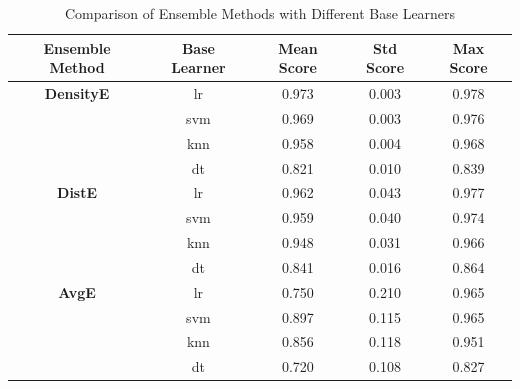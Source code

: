 \documentclass[lettersize,journal]{IEEEtran}
\begin{document}
	\setlength{\tabcolsep}{2pt} %
	
	\begin{table}[htbp]
		
	    \begin{center}
			
			\caption{Comparison of Ensemble Methods with Different Base Learners}
			
			\label{tab:ensemble_comparison}
			
			\begin{tabular}{|c|c|c|c|c|}
				
				\hline 
				
				\textbf{Ensemble Method} & \textbf{Base Learner} & \textbf{Mean Score} & \textbf{Std Score} & \textbf{Max Score} \\
				
				\hline
				
				\textbf{DensityE} & lr & 0.973 & 0.003 & 0.978 \\
				
				& svm & 0.969 & 0.003 & 0.976 \\
				
				& knn & 0.958 & 0.004 & 0.968 \\
				
				& dt & 0.821 & 0.010 & 0.839 \\
				
				\hline 
				
				\textbf{DistE} & lr & 0.962 & 0.043 & 0.977 \\
				
				& svm & 0.959 & 0.040 & 0.974 \\
				
				& knn & 0.948 & 0.031 & 0.966 \\
				
				& dt & 0.841 & 0.016 & 0.864 \\
				
				\hline 
				
				\textbf{AvgE} & lr & 0.750 & 0.210 & 0.965 \\
				
				& svm & 0.897 & 0.115 & 0.965 \\
				
				& knn & 0.856 & 0.118 & 0.951 \\
				
				& dt & 0.720 & 0.108 & 0.827 \\
				

\end{tabular}
\end{center}
\end{table}
\end{document}
